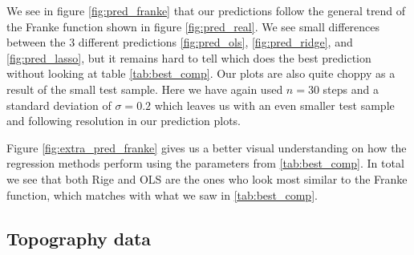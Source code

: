 \documentclass[12pt]{article}
\begin{document}
We see in figure \ref{fig:pred_franke} that our predictions follow the general trend of the Franke function shown in figure \ref{fig:pred_real}. We see small differences between the 3 different predictions \ref{fig:pred_ols}, \ref{fig:pred_ridge}, and \ref{fig:pred_lasso}, but it remains hard to tell which does the best prediction without looking at table \ref{tab:best_comp}. Our plots are also quite choppy as a result of the small test sample. Here we have again used $n=30$ steps and a standard deviation of $\sigma=0.2$ which leaves us with an even smaller test sample and following resolution in our prediction plots.

Figure \ref{fig:extra_pred_franke} gives us a better visual understanding on how the regression methods perform using the parameters from \ref{tab:best_comp}. In total we see that both Rige and OLS are the ones who look most similar to the Franke function, which matches with what we saw in \ref{tab:best_comp}.
\subsection{Topography data}
\end{document}
